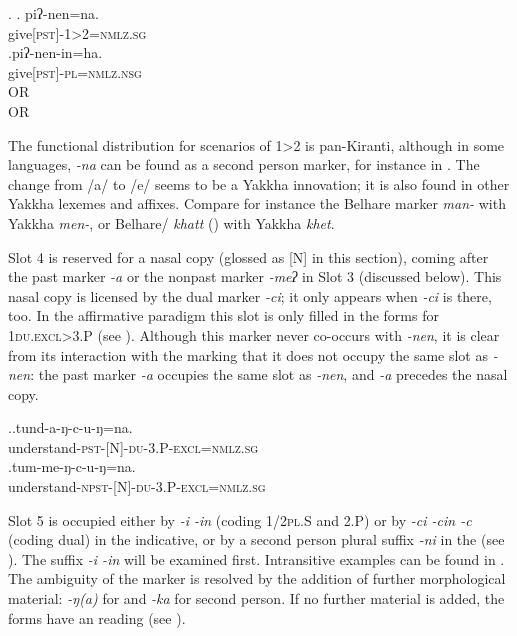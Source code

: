 \ex. \ag. piʔ-nen=na.\\
	give{\scshape [pst]-1>2=nmlz.sg}\\
	\bg.\label{ex-nenin}piʔ-nen-in=ha.\\
	give{\scshape [pst]-pl=nmlz.nsg}\\
	 OR\\
	 OR\\

The functional distribution for scenarios of 1>2 is  pan-Kiranti, although in some languages, \emph{-na} can be found as a second person marker, for instance in  \citep[148]{Lahaussois2002Thulung}. The change from /a/ to /e/ seems to be a Yakkha innovation; it is also found in other Yakkha lexemes and affixes. Compare for instance the Belhare  marker \emph{man-} with Yakkha \emph{men-}, or Belhare/ \emph{khatt} () with Yakkha \emph{khet}. 
	


Slot 4 is reserved for a nasal copy (glossed as {\scshape [N]} in this section), coming after the past marker  \emph{-a} or the nonpast marker \emph{-meʔ} in Slot 3 (discussed below). This nasal copy is licensed by the dual marker \emph{-ci}; it only appears  when \emph{-ci} is there, too. In the affirmative paradigm this slot is only filled in the forms for {\scshape 1du.excl>3.P} (see \Next). Although this marker never co-occurs with \emph{-nen}, it is clear from its interaction with the  marking that it does not occupy the same slot as \emph{-nen}: the past marker \emph{-a} occupies the same slot as \emph{-nen}, and \emph{-a} precedes the nasal copy.
\largerpage[2]

\ex.\ag.tund-a-ŋ-c-u-ŋ=na.\\
understand{\scshape -pst-[N]-du-3.P-excl=nmlz.sg}\\
\bg.tum-me-ŋ-c-u-ŋ=na.\\
understand{\scshape -npst-[N]-du-3.P-excl=nmlz.sg}\\

Slot 5 is occupied either by \emph{-i \ti -in} (coding {\scshape 1/2pl.S} and {\scshape 2.P}) or by \emph{-ci \ti -cin \ti -c} (coding dual) in the indicative, or by a second person plural suffix \emph{-ni} in the  (see ). The suffix \emph{-i \ti -in} will be examined first. Intransitive examples can be found in \Next. The ambiguity of the marker is resolved by the addition of further morphological material: \emph{-ŋ(a)} for  and \emph{-ka} for second person. If no further material is added, the forms have an  reading (see \Next[c]).

